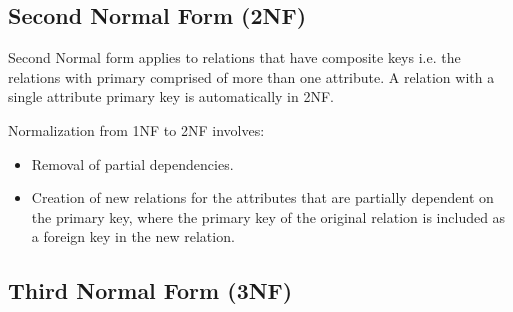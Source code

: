 \documentclass[12pt letter]{report}
\begin{document}
\subsection{Second Normal Form (2NF)}


Second Normal form applies to relations that have composite keys i.e. the relations with primary comprised of more than
one attribute. A relation with a single attribute primary key is automatically in 2NF.

Normalization from 1NF to 2NF involves:
\begin{itemize}
  \item Removal of partial dependencies.
  \item Creation of new relations for the attributes that are partially dependent on the primary key, where the primary
        key of the original relation is included as a foreign key in the new relation.
\end{itemize}

\subsection{Third Normal Form (3NF)}

\end{document}
